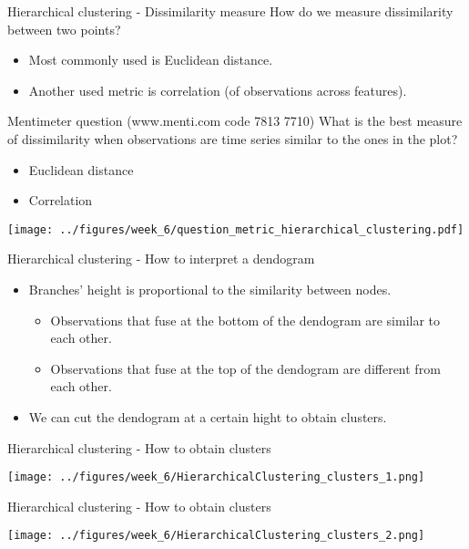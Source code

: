 \documentclass[notes]{beamer}          %
\begin{document}
\begin{frame}{Hierarchical clustering - Dissimilarity measure}
How do we measure dissimilarity between two points?
\begin{itemize}
\item  Most commonly used is Euclidean distance.
\item Another used metric is correlation (of observations across features).
\end{itemize}
\end{frame}

\begin{frame}{Mentimeter question (www.menti.com code 7813 7710)}
What is the best measure of dissimilarity when observations are time series similar to the ones in the plot?
\begin{itemize}
\item Euclidean distance
\item Correlation
\end{itemize}
\begin{center}
\texttt{[image: ../figures/week\_6/question\_metric\_hierarchical\_clustering.pdf]}  
\end{center}
\end{frame}

\begin{frame}{Hierarchical clustering - How to interpret a dendogram}
\begin{itemize}
\item Branches' height is proportional to the similarity between nodes.
\begin{itemize}
\item Observations that fuse at the bottom of the dendogram are similar to each other.
\item Observations that fuse at the top of the dendogram are different from each other.
\end{itemize}
\item We can cut the dendogram at a certain hight to obtain clusters.
\end{itemize}
\end{frame}

\begin{frame}{Hierarchical clustering - How to obtain clusters}
\begin{center}
\texttt{[image: ../figures/week\_6/HierarchicalClustering\_clusters\_1.png]}  
\end{center}
\end{frame}

\begin{frame}{Hierarchical clustering - How to obtain clusters}
\begin{center}
\texttt{[image: ../figures/week\_6/HierarchicalClustering\_clusters\_2.png]}  
\end{center}
\end{frame}
\end{document}
